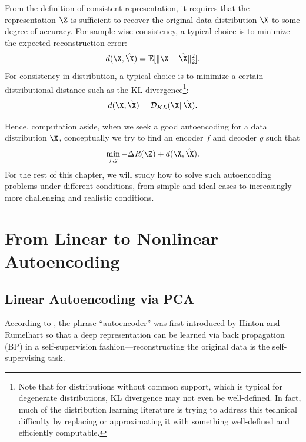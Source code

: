 \documentclass[../../book-main.tex]{subfiles}
\begin{document}
From the definition of consistent representation, it requires that
the representation $\Z$ is sufficient to recover the original data
distribution $\X$ to some degree of accuracy. For sample-wise
consistency, a typical choice is to minimize the expected reconstruction error:
\begin{equation}
  d(\X, \hat \X) = \mathbb{E}[\|\X - \hat\X\|_2^2].
\end{equation}
For consistency in distribution, a typical choice is to minimize a
certain distributional distance such as the KL
divergence\footnote{Note that for distributions without common
  support, which is typical for degenerate distributions, KL divergence
  may not even be well-defined. In fact, much of the distribution
  learning literature is trying to address this technical difficulty by
  replacing or approximating it with something well-defined and
efficiently computable.}:
\begin{equation}
  d(\X, \hat \X) = \mathcal{D}_{KL}(\X\|\hat\X).
\end{equation}

Hence, computation aside, when we seek a good autoencoding for a data
distribution $\X$,  conceptually we try to find an encoder $f$ and
decoder $g$ such that
\begin{equation}
  \min_{f, g} - \Delta R(\Z) + d(\X, \hat \X).
  \label{eqn:autoencode-objective-ch5}
\end{equation}
For the rest of this chapter, we will study how to solve such
autoencoding problems under different conditions, from simple and
ideal cases to increasingly more challenging and realistic conditions.

\section{From Linear to Nonlinear Autoencoding}\label{sec:NLPCA}

\subsection{Linear Autoencoding via PCA}
According to \cite{Baldi2011}, the phrase ``autoencoder'' was first
introduced by Hinton and Rumelhart \cite{Rumelhart1986} so that a
deep representation can be learned via back propagation (BP) in a self-supervision fashion---reconstructing the original data is the self-supervising task.
\end{document}
